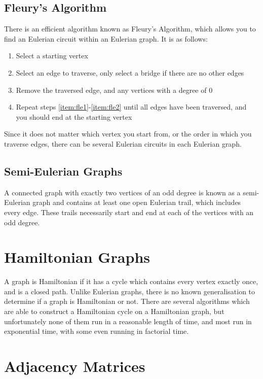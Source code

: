 \subsection*{Fleury's Algorithm}

There is an efficient algorithm known as Fleury's Algorithm, which allows you to find an Eulerian circuit within an
 Eulerian graph. It is as follows:
\begin{enumerate}[start=0]
  \item Select a starting vertex
  \item\label{item:fle1} Select an edge to traverse, only select a bridge if there are no other edges
  \item\label{item:fle2} Remove the traversed edge, and any vertices with a degree of 0
  \item Repeat steps \ref*{item:fle1}-\ref*{item:fle2} until all edges have been traversed, and you should end at the starting vertex
\end{enumerate}

Since it does not matter which vertex you start from, or the order in which you traverse edges, there can be several
 Eulerian circuits in each Eulerian graph.

\subsection*{Semi-Eulerian Graphs}

A connected graph with exactly two vertices of an odd degree is known as a semi-Eulerian graph and contains at least one
 open Eulerian trail, which includes every edge. These trails necessarily start and end at each of the vertices with an
 odd degree.

\section*{Hamiltonian Graphs}

A graph is Hamiltonian if it has a cycle which contains every vertex exactly once, and is a closed path. Unlike Eulerian
 graphs, there is no known generalisation to determine if a graph is Hamiltonian or not. There are several algorithms
 which are able to construct a Hamiltonian cycle on a Hamiltonian graph, but unfortunately none of them run in a reasonable
 length of time, and most run in exponential time, with some even running in factorial time.

\section*{Adjacency Matrices}

